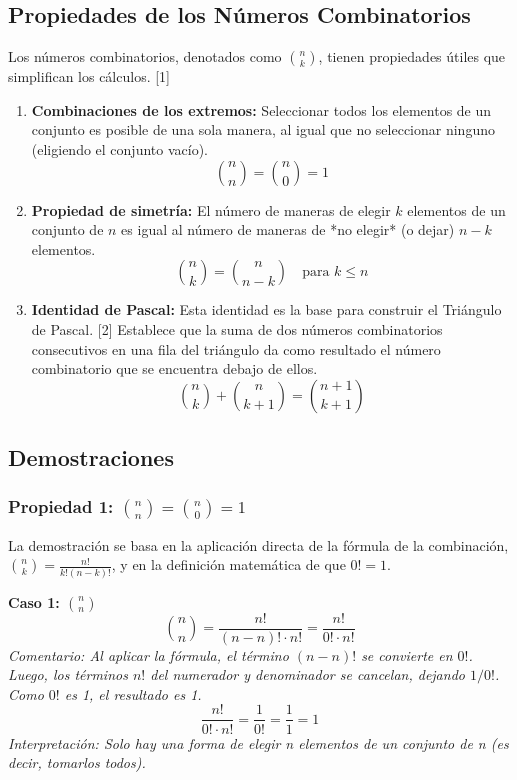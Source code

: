 \documentclass[12pt, letterpaper]{article}
\begin{document}
\subsection{Propiedades de los Números Combinatorios}
Los números combinatorios, denotados como $\binom{n}{k}$, tienen propiedades útiles que simplifican los cálculos. [1]
\begin{enumerate}
	\item \textbf{Combinaciones de los extremos:} Seleccionar todos los elementos de un conjunto es posible de una sola manera, al igual que no seleccionar ninguno (eligiendo el conjunto vacío).
	      \[ \binom{n}{n} = \binom{n}{0} = 1 \]

	\item \textbf{Propiedad de simetría:} El número de maneras de elegir $k$ elementos de un conjunto de $n$ es igual al número de maneras de *no elegir* (o dejar) $n-k$ elementos.
	      \[ \binom{n}{k} = \binom{n}{n-k} \quad \text{para } k \leq n \]

	\item \textbf{Identidad de Pascal:} Esta identidad es la base para construir el Triángulo de Pascal. [2] Establece que la suma de dos números combinatorios consecutivos en una fila del triángulo da como resultado el número combinatorio que se encuentra debajo de ellos.
	      \[ \binom{n}{k} + \binom{n}{k+1} = \binom{n+1}{k+1} \]
\end{enumerate}

\subsection{Demostraciones}
\subsubsection{Propiedad 1: $\binom{n}{n} = \binom{n}{0} = 1$}
La demostración se basa en la aplicación directa de la fórmula de la combinación, $\binom{n}{k} = \frac{n!}{k!(n-k)!}$, y en la definición matemática de que $0! = 1$.

\vspace{1em}
\noindent \textbf{Caso 1: $\binom{n}{n}$}
\[ \binom{n}{n} = \frac{n!}{(n-n)! \cdot n!} = \frac{n!}{0! \cdot n!} \]
\textit{Comentario: Al aplicar la fórmula, el término $(n-n)!$ se convierte en $0!$. Luego, los términos $n!$ del numerador y denominador se cancelan, dejando $1/0!$. Como $0!$ es 1, el resultado es 1.}
\[ \frac{n!}{0! \cdot n!} = \frac{1}{0!} = \frac{1}{1} = 1 \]
\textit{Interpretación: Solo hay una forma de elegir n elementos de un conjunto de n (es decir, tomarlos todos).}
\end{document}
